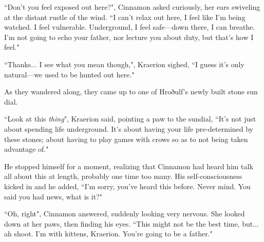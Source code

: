 ``Don't you feel exposed out here?", Cinnamon asked curiously, her ears swiveling at the distant rustle of the wind. ``I can't relax out here, I feel like I'm being watched. I feel vulnerable. Underground, I feel safe---down there, I can breathe. I'm not going to echo your father, nor lecture you about duty, but that's how I feel."

``Thanks... I see what you mean though,", Kraerion sighed, ``I guess it's only natural---we used to be hunted out here."

As they wandered along, they came up to one of Hroðulf's newly built stone sun dial.

``Look at this \textit{thing}", Kraerion said, pointing a paw to the sundial, ``It's not just about spending life underground. It's about having your life pre-determined by these stones; about having to play games with crows so as to not being taken advantage of."

He stopped himself for a moment, realizing that Cinnamon had heard him talk all about this at length, probably one time too many. His self-consciousness kicked in and he added, ``I'm sorry, you've heard this before. Never mind. You said you had news, what is it?"

``Oh, right", Cinnamon answered, suddenly looking very nervous. She looked down at her paws, then finding his eyes. ``This might not be the best time, but... ah shoot. I'm with kittens, Kraerion. You're going to be a father."

